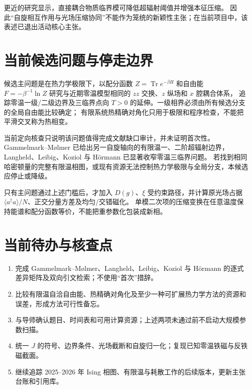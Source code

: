 \documentclass[UTF8,11pt,a4paper]{ctexart}
\begin{document}
更近的研究显示，直接耦合物质临界模可降低超辐射阈值并增强本征压缩\cite{Sur2026Critical}。
因此“自旋相互作用与光场压缩协同”不能作为笼统的新颖性主张；在当前项目中，该表述已退出活动核心主张。

\section{当前候选问题与停走边界}

候选主问题是在热力学极限下，以配分函数 $Z=\operatorname{Tr}e^{-\beta H}$ 和自由能
$F=-\beta^{-1}\ln Z$ 研究与近期零温模型相同的 $zz$ 交换、$z$ 纵场和 $x$ 腔耦合体系，
追踪零温一级/二级边界及三临界点向 $T>0$ 的延伸。一级相界必须由所有候选分支的全局自由能比较确定；
有限系统热精确对角化只用于极限和程序检查，不能把平滑交叉称为热相变。

当前定向核查只说明该问题值得完成文献缺口审计，并未证明首次性。
Gammelmark--Mølmer 已给出另一自旋轴向的有限温一、二阶超辐射边界，
Langheld、Leibig、Koziol 与 Hörmann 已显著收窄零温三临界问题。
若找到相同哈密顿量的完整有限温相图，或现有资源无法控制热力学极限与全局分支，本候选应停止或降级。

只有主问题通过上述门槛后，才加入 $D(g)$、$\xi$ 受约束路径，并计算原光场占据
$\langle a^\dagger a\rangle/N$、正交分量方差及均匀/交错磁化。
单模二次项的压缩变换在任意温度保持能谱和配分函数等价，不能把重参数化包装成新相。

\section{当前待办与核查点}

\begin{enumerate}
  \item 完成 Gammelmark--Mølmer、Langheld、Leibig、Koziol 与 Hörmann 的逐式差异矩阵及双向引文检索；不使用“首次”措辞。
  \item 比较有限温自洽自由能、热精确对角化及至少一种可扩展热力学方法的资源和误差，形成方法可行性备忘。
  \item 与导师确认题目、时间表和可用计算资源；上述两项未通过前不启动大规模参数扫描。
  \item 统一 $J$ 的符号、边界条件、光场截断和自旋归一化；复现已知零温铁磁与反铁磁截面。
  \item 继续追踪 2025--2026 年 Ising 相图、有限温与耗散工作的后续版本，更新主张台账和引用库。
\end{enumerate}

\printbibliography[title={参考文献}]
\end{document}
